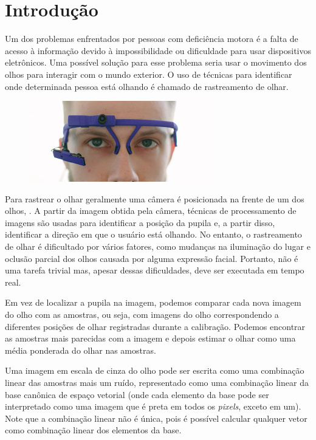 \chapter{Introdução}

Um dos problemas enfrentados por pessoas com deficiência motora é a falta de acesso à informação devido à impossibilidade ou dificuldade para usar dispositivos eletrônicos. Uma possível solução para esse problema seria usar o movimento dos olhos para interagir com o mundo exterior. O uso de técnicas para identificar onde determinada pessoa está olhando é chamado de rastreamento de olhar.

\begin{figure}
\centering
\includegraphics[scale=1]{imagens/dmk-headset.jpg}
\caption{ }
\label{fig:cam_olho}
\end{figure}

Para rastrear o olhar geralmente uma câmera é posicionada na frente de um dos olhos, . A partir da imagem obtida pela câmera, técnicas de processamento de imagens são usadas para identificar a posição da pupila e, a partir disso, identificar a direção em que o usuário está olhando. No entanto, o rastreamento de olhar é dificultado por vários fatores, como mudanças na iluminação do lugar e oclusão parcial dos olhos causada por alguma expressão facial. Portanto, não é uma tarefa trivial mas, apesar dessas dificuldades, deve ser executada em tempo real.

Em vez de localizar a pupila na imagem, podemos comparar cada nova imagem do olho com as amostras, ou seja, com imagens do olho correspondendo a diferentes posições de olhar registradas durante a calibração. Podemos encontrar as amostras mais parecidas com a imagem e depois estimar o olhar como uma média ponderada do olhar nas amostras.

Uma imagem em escala de cinza do olho pode ser escrita como uma combinação linear das amostras mais um ruído, representado como uma combinação linear da base canônica de espaço vetorial (onde cada elemento da base pode ser interpretado como uma imagem que é preta em todos os \textit{pixels}, exceto em um). Note que a combinação linear não é única, pois é possível calcular qualquer vetor como combinação linear dos elementos da base.

